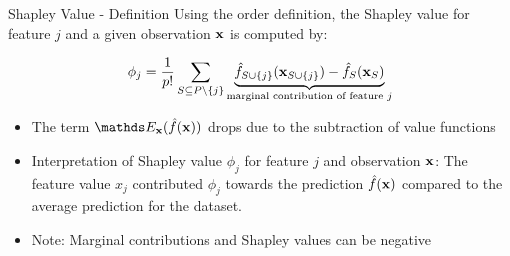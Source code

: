 \documentclass[11pt,compress,t,notes=noshow, aspectratio=169, xcolor=table]{beamer}
\begin{document}
\begin{frame}{Shapley Value - Definition  }
  Using the order definition, the Shapley value for feature $j$ and a given observation $\xv$ is computed by:

     $$ \phi_j  = \frac{1}{p!} \sum_{S \subseteq P\setminus \{j\}} \underbrace{\fh_{\Scupj}(\xv_{\Scupj}) - \fh_{S}(\xv_{S})}_{\text{marginal contribution of feature $j$}} $$
\begin{itemize}
    \item The term $\E_{\xv}(\fh(\xv))$ drops due to the subtraction of value functions
  \item Interpretation of Shapley value $\phi_j$ for feature $j$ and observation $\xv$:
  The feature value $x_j$ contributed $\phi_j$ towards the prediction $\fh(\xv)$ compared to the average prediction for the dataset.
   \item Note: Marginal contributions and Shapley values can be negative
\end{itemize}
\lz

\end{frame}
\end{document}
